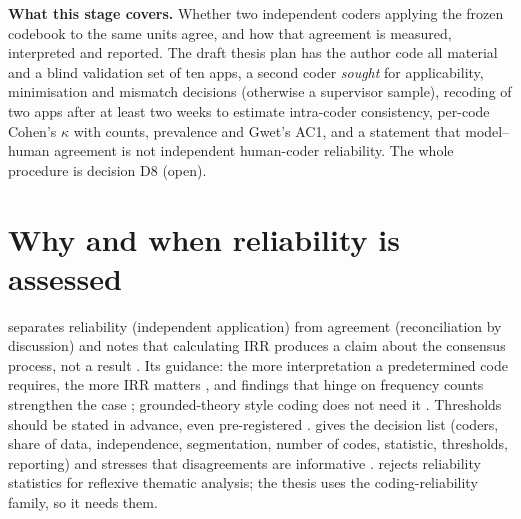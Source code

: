 
\noindent\textbf{What this stage covers.} Whether two independent coders applying the frozen codebook to the same units agree, and how that agreement is measured, interpreted and reported. The draft thesis plan has the author code all material and a blind validation set of ten apps, a second coder \emph{sought} for applicability, minimisation and mismatch decisions (otherwise a supervisor sample), recoding of two apps after at least two weeks to estimate intra-coder consistency, per-code Cohen's $\kappa$ with counts, prevalence and Gwet's AC1, and a statement that model--human agreement is not independent human-coder reliability. The whole procedure is decision D8 (open).

\section{Why and when reliability is assessed}
 separates reliability (independent application) from agreement (reconciliation by discussion)  and notes that calculating IRR produces a claim about the consensus process, not a result . Its guidance: the more interpretation a predetermined code requires, the more IRR matters , and findings that hinge on frequency counts strengthen the case ; grounded-theory style coding does not need it . Thresholds should be stated in advance, even pre-registered .  gives the decision list (coders, share of data, independence, segmentation, number of codes, statistic, thresholds, reporting) and stresses that disagreements are informative .  rejects reliability statistics for reflexive thematic analysis; the thesis uses the coding-reliability family, so it needs them.

